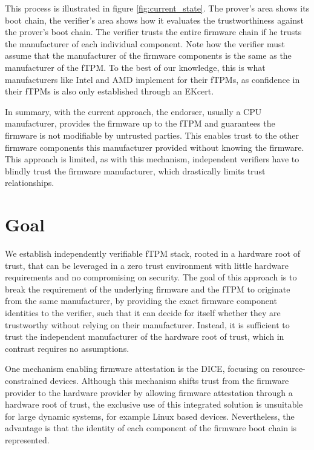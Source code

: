 

This process is illustrated in figure \autoref{fig:current_state}.
The prover's area shows its boot chain, the verifier's area shows how it evaluates the trustworthiness against the prover's boot chain.
The verifier trusts the entire firmware chain if he trusts the manufacturer of each individual component.
Note how the verifier must assume that the manufacturer of the firmware components is the same as the manufacturer of the fTPM\@.
To the best of our knowledge, this is what manufacturers like Intel and AMD implement for their \acp{fTPM}, as confidence in their \acp{fTPM} is also only established through an EKcert.


In summary, with the current approach, the endorser, usually a CPU manufacturer, provides the firmware up to the fTPM and guarantees the firmware is not modifiable by untrusted parties.
This enables trust to the other firmware components this manufacturer provided without knowing the firmware.
This approach is limited, as with this mechanism, independent verifiers have to blindly trust the firmware manufacturer, which drastically limits trust relationships.

\section{Goal}

We establish independently verifiable fTPM stack, rooted in a hardware root of trust, that can be leveraged in a zero trust environment with little hardware requirements and no compromising on security.
The goal of this approach is to break the requirement of the underlying firmware and the fTPM to originate from the same manufacturer, by providing the exact firmware component identities to the verifier, such that it can decide for itself whether they are trustworthy without relying on their manufacturer.
Instead, it is sufficient to trust the independent manufacturer of the hardware root of trust, which in contrast requires no assumptions.


One mechanism enabling firmware attestation is the \ac{DICE}, focusing on resource-constrained devices.
Although this mechanism shifts trust from the firmware provider to the hardware provider by allowing firmware attestation through a hardware root of trust, the exclusive use of this integrated solution is unsuitable for large dynamic systems, for example Linux based devices.
Nevertheless, the advantage is that the identity of each component of the firmware boot chain is represented.

